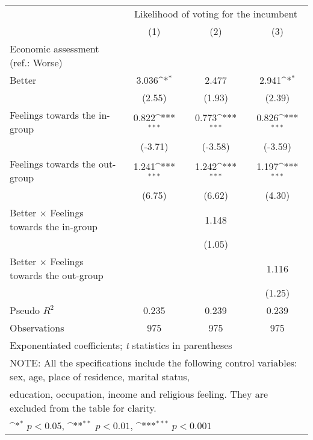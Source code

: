 {
\def\sym#1{\ifmmode^{#1}\else\(^{#1}\)\fi}
\begin{tabular}{l*{3}{c}}
\toprule
                &\multicolumn{3}{c}{Likelihood of voting for the incumbent}\\\cmidrule(lr){2-4}
                &\multicolumn{1}{c}{(1)}         &\multicolumn{1}{c}{(2)}         &\multicolumn{1}{c}{(3)}         \\
\midrule
Economic assessment (ref.: Worse)&                  &                  &                  \\
Better          &    3.036\sym{*}  &    2.477         &    2.941\sym{*}  \\
                &   (2.55)         &   (1.93)         &   (2.39)         \\
Feelings towards the in-group&    0.822\sym{***}&    0.773\sym{***}&    0.826\sym{***}\\
                &  (-3.71)         &  (-3.58)         &  (-3.59)         \\
Feelings towards the out-group&    1.241\sym{***}&    1.242\sym{***}&    1.197\sym{***}\\
                &   (6.75)         &   (6.62)         &   (4.30)         \\
Better $\times$ Feelings towards the in-group&                  &    1.148         &                  \\
                &                  &   (1.05)         &                  \\
Better $\times$ Feelings towards the out-group&                  &                  &    1.116         \\
                &                  &                  &   (1.25)         \\
\midrule
Pseudo \(R^{2}\)&    0.235         &    0.239         &    0.239         \\
Observations    &      975         &      975         &      975         \\
\bottomrule
\multicolumn{4}{l}{\footnotesize Exponentiated coefficients; \textit{t} statistics in parentheses}\\
\multicolumn{4}{l}{\footnotesize NOTE: All the specifications include the following control variables: sex, age, place of residence, marital status,}\\
\multicolumn{4}{l}{\footnotesize education, occupation, income and religious feeling. They are excluded from the table for clarity.}\\
\multicolumn{4}{l}{\footnotesize \sym{*} \(p<0.05\), \sym{**} \(p<0.01\), \sym{***} \(p<0.001\)}\\
\end{tabular}
}

